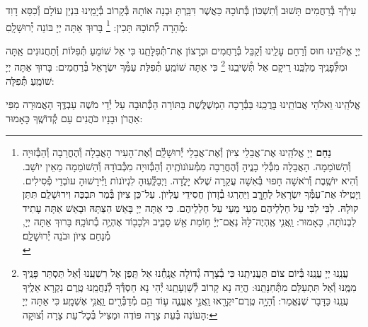\documentclass[twoside, openany, parskip=half, 11pt]{book}
\begin{document}
עִירְ֯ךָ בְּ֯רַחֲמִים תָּשׁוּב וְ֯תִשְׁכּוֹן בְּ֯תוֹכָהּ כַּאֲשֶׁר דִּבַּֽרְתָּ וּבְנֵה אוֹתָהּ בְּ֯קָרוֹב בְּ֯יָמֵֽינוּ בִּנְיַן עוֹלָם וְ֯כִסֵּא דָוִד מְ֯הֵרָה לְ֯תוֹכָהּ תָּכִין:
\footnote{
\textbf{נַחֵם}
יְיָ אֱלֹהֵֽינוּ אֶת־אֲבֵלֵי צִיּוֺן וְ֯אֶת־אֲבֵלֵי יְ֯רוּשָׁלַֽ֔֗͏ִם וְ֯אֶת־הָעִיר הָאֲבֵלָה וְ֯הֶחֳרֵבָה וְ֯הַבְּ֯זוּיָה וְ֯הַשׁוֺמֵמָה. הָאֲבֵלָה מִבְּ֯לִי בָנֱיהָ וְ֯הֶחֳרֵבָה מִמְּ֯עוֺנוֺתֶֽיהָ וְ֯הַבְּ֯זוּיָה מִכְּ֯בוֺדָהּ וְ֯הַשׁוֺמֵמָה מֵאֵין יוֺשֵׁב. וְ֯הִיא יוֺשֶֽׁבֶת וְ֯רֹאשָׁה חָפוּי בְּ֯אִשָׁה עֲקַרָה שֶׁלֹּא יָלֳדָה. וַיְבַלְְּ֯עֽוּהָ לִגְיוֺנוֺת וַיְּ֯ירָשׁוּהָ עוֺבְדֵי פְ֯סִילִים. וַיָטִֽילוּ אֶת־עַמְּ֯ךָ יִשְׂרָאֵל לֶחָרֱֽב וַיַּהַרְגוּ בְ֯זָדוֺן חֲסִידֵי עֶלְיוֺן. עַל־כֵּן צִיּוֺן בְּ֯מַר תּבְכֶּה וִירוּשָׁלַֽ͏ִם תִּתֵּן קוֺלָהּ. לִבִּי לִבִּי עַל חַלְלֵיהֶם מֵעַי מֵעַי עַל חַלְלֵיהֶם. כִּי אַתָּה יְיָ בָּאֵשׁ הִצַּתָּהּ וּבָאֵשׁ אַתָּה עָתִיד לִבְנוֺתָה, כָּאָמוּר: וַֽאֲנִ֤י אֶֽהְיֶה־לָּהּ֙ נְאֻם־יְיָ֔ ח֥וֹמַת אֵ֖שׁ סָבִ֑יב וּלְכָב֖וֹד אֶהְיֶ֥ה בְ֯תוֹכָֽהּ׃
בָּרוּךְ אַתָּה יְיָ, מְ֯נַחֵם צִיוֺן וּבֹנֵה יְ֯רוּשָׁלַֽ͏ִם׃ \\
}
בָּרוּךְ אַתָּה יְיָ בּוֹנֵה יְ֯רוּשָׁלָֽםִ:

\weekdaysamalchus

יְיָ אֱלֹהֵֽינוּ חוּס וְ֯רַחֵם עָלֵֽינוּ וְ֯קַבֵּל בְּ֯רַחֲמִים וּבְרָצוֹן אֶת־תְּ֯פִלָּתֵֽנוּ כִּי אֵל שׁוֹמֵעַ תְּ֯פִלּוֹת וְ֯תַחֲנוּנִים אַֽתָּה וּמִלְּ֯פָנֶֽיךָ מַלְכֵּֽנוּ רֵיקָם אַל תְּ֯שִׁיבֵֽנוּ
\footnote{
עֲנֵֽנוּ יְיָ עֲנֵֽנוּ בְּ֯יוֹם צוֹם תַּעֲנִיתֵֽנוּ כִּי בְ֯צָרָה גְ֯דוֹלָה אֲנָֽחְ֯נוּ אַל תֵּֽפֶן אֶל רִשְׁעֵֽנוּ וְ֯אַל תַּסְתֵּר פָּנֶֽיךָ מִמֶּֽנּוּ וְ֯אַל תִּתְעַלַּם מִתְּ֯חִנָּתֵֽנוּ: הֱיֵה נָא קָרוֹב לְ֯שַׁוְעָתֵֽנוּ יְ֯הִי נָא חַסְדְּ֯ךָ לְ֯נַחֲמֵֽנוּ טֶֽרֶם נִקְרָא אֵלֶֽיךָ עֲנֵֽנוּ כַּדָּבָר שֶׁנֶּאֱמַר:
וְ֯הָיָ֥ה טֶֽרֶם־יִקְרָ֖אוּ וַֽאֲנִ֣י אֶעֱנֶ֑ה ע֛וֹד הֵ֥ם מְ֯דַבְּ֯רִ֖ים וַֽאֲנִ֥י אֶשְׁמָֽע׃ כִּי אַתָּה יְיָ הָעוֹנֶה בְּ֯עֵת צָרָה פּוֹדֶה וּמַצִּיל בְּ֯כׇל־עֵת צָרָה וְ֯צוּקָה:
}
כִּי אַתָּה שׁוֹמֵֽעַ תְּ֯פִלַּת עַמְּ֯ךָ יִשְׂרָאֵל בְּ֯רַחֲמִים: בָּרוּךְ אַתָּה יְיָ שׁוֹמֵֽעַ תְּ֯פִלָּה:

\retzeh

\yaalehveyavo

\zion

\modim

\alhanisim

\weekdaysahodos

אֱלֹהֵֽינוּ וֵאלֹהֵי אֲבוֹתֵֽינוּ בָּרֲכֵֽנוּ בַּבְּ֯רָכָה הַמְשֻׁלֶּֽשֶׁת בַּתּוֹרָה
הַכְּ֯תוּבָה עַל יְ֯דֵי מֹשֶׁה עַבְדֶּֽךָ הָאֲמוּרָה מִפִּי אַהֲרֹן וּבָנָיו כֹּהֲנִים עַם קְ֯דוֹשֶֽׁךָ כָּאָמוּר:
\end{document}
